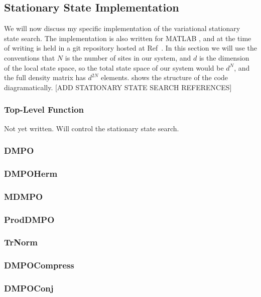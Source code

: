 \FloatBarrier 
 
 \subsection{Stationary State Implementation}
 We will now discuss my specific implementation of the variational stationary state search. The implementation is also written for MATLAB \cite{MATLAB}, and at the time of writing is held in a git repository hosted at Ref~\cite{otb:gitVSSS}. In this section we will use the conventions that \(N\) is the number of sites in our system, and \(d\) is the dimension of the local state space, so the total state space of our system would be \(d^{N}\), and the full density matrix has \(d^{2N}\) elements.  shows the structure of the code diagramatically. [ADD STATIONARY STATE SEARCH REFERENCES]
 
 \subsubsection{Top-Level Function}
 Not yet written. Will control the stationary state search.
 
 \subsubsection{DMPO}
 
 \subsubsection{DMPOHerm}
 
 \subsubsection{MDMPO}
 
 \subsubsection{ProdDMPO}
 
 \subsubsection{TrNorm}
 
 \subsubsection{DMPOCompress}
 
 \subsubsection{DMPOConj}
 
